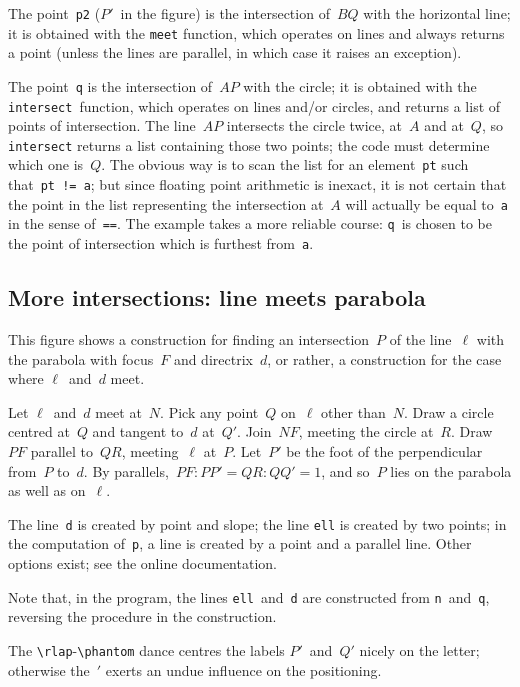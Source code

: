 \documentclass{enkidudoc}
\begin{document}

The point~\texttt{p2} ($P'$~in the figure)
is the intersection of~$BQ$ with the horizontal line;
it is obtained with the \texttt{meet} function, which operates on lines
and always returns a point
(unless the lines are parallel, in which case it raises an exception).

The point~\texttt{q} is the intersection of~$AP$ with the circle;
it is obtained with the \texttt{intersect}~function,
which operates on lines and/or circles,
and returns a list of points of intersection.
The line~$AP$ intersects the circle twice, at~$A$ and at~$Q$,
so \texttt{intersect} returns a list containing those two points;
the code must determine which one is~$Q$.
The obvious way is to scan the list
for an element~\texttt{pt} such that~\texttt{pt != a};
but since floating point arithmetic is inexact,
it is not certain that the point in the list representing
the intersection at~$A$ will actually be equal to~\texttt{a}
in the sense of~\texttt{==}.
The example takes a more reliable course:
\texttt{q}~is chosen to be the point of intersection
which is furthest from~\texttt{a}.

\pagebreak
\subsection{More intersections: line meets parabola}

This figure shows a construction
for finding an intersection~$P$ of the line~$\ell$
with the parabola with focus~$F$ and directrix~$d$,
or rather, a construction for the case where $\ell$~and~$d$ meet.

Let $\ell$~and~$d$ meet at~$N$.
Pick any point~$Q$ on~$\ell$ other than~$N$.
Draw a circle centred at~$Q$ and tangent to~$d$ at~$Q'$.
Join~$NF$, meeting the circle at~$R$.
Draw~$PF$ parallel to~$QR$, meeting~$\ell$ at~$P$.
Let~$P'$ be the foot of the perpendicular from~$P$ to~$d$.
By parallels,~$PF : PP' = QR : QQ' = 1$,
and so~$P$ lies on the parabola as well as on~$\ell$.


The line~\texttt{d} is created by point and slope;
the line \texttt{ell} is created by two points;
in the computation of~\texttt{p}, a line is created
by a point and a parallel line.
Other options exist; see the online documentation.

Note that, in the program, the lines \texttt{ell}~and~\texttt{d}
are constructed from \texttt{n}~and~\texttt{q},
reversing the procedure in the construction.

The \verb:\rlap:-\verb:\phantom: dance centres the labels
$P'$~and~$Q'$ nicely on the letter;
otherwise the~$'$ exerts an undue influence on the positioning.
\end{document}
